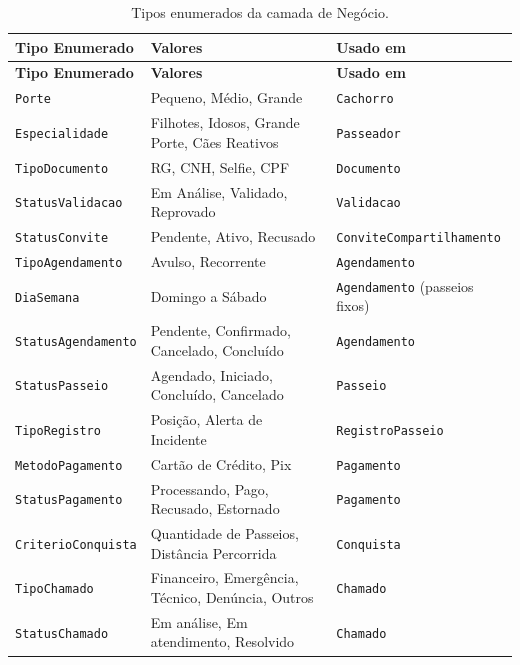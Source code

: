\begin{footnotesize}
\begin{longtable}{|p{3.2cm}|p{5.8cm}|p{4.4cm}|}
	\caption{Tipos enumerados da camada de Negócio.}
	\label{tabela-enumerados}\\\hline

	\rowcolor{lightgray}
	\textbf{Tipo Enumerado} & \textbf{Valores} & \textbf{Usado em} \\\hline
	\endfirsthead
	\hline
	\rowcolor{lightgray}
	\textbf{Tipo Enumerado} & \textbf{Valores} & \textbf{Usado em} \\\hline
	\endhead

	\texttt{Porte} & Pequeno, Médio, Grande & \texttt{Cachorro} \\\hline
	\texttt{Especialidade} & Filhotes, Idosos, Grande Porte, Cães Reativos & \texttt{Passeador} \\\hline
	\texttt{TipoDocumento} & RG, CNH, Selfie, CPF & \texttt{Documento} \\\hline
	\texttt{StatusValidacao} & Em Análise, Validado, Reprovado & \texttt{Validacao} \\\hline
	\texttt{StatusConvite} & Pendente, Ativo, Recusado & \texttt{ConviteCompartilhamento} \\\hline
	\texttt{TipoAgendamento} & Avulso, Recorrente & \texttt{Agendamento} \\\hline
	\texttt{DiaSemana} & Domingo a Sábado & \texttt{Agendamento} (passeios fixos) \\\hline
	\texttt{StatusAgendamento} & Pendente, Confirmado, Cancelado, Concluído & \texttt{Agendamento} \\\hline
	\texttt{StatusPasseio} & Agendado, Iniciado, Concluído, Cancelado & \texttt{Passeio} \\\hline
	\texttt{TipoRegistro} & Posição, Alerta de Incidente & \texttt{RegistroPasseio} \\\hline
	\texttt{MetodoPagamento} & Cartão de Crédito, Pix & \texttt{Pagamento} \\\hline
	\texttt{StatusPagamento} & Processando, Pago, Recusado, Estornado & \texttt{Pagamento} \\\hline
	\texttt{CriterioConquista} & Quantidade de Passeios, Distância Percorrida & \texttt{Conquista} \\\hline
	\texttt{TipoChamado} & Financeiro, Emergência, Técnico, Denúncia, Outros & \texttt{Chamado} \\\hline
	\texttt{StatusChamado} & Em análise, Em atendimento, Resolvido & \texttt{Chamado} \\\hline
\end{longtable}
\end{footnotesize}



